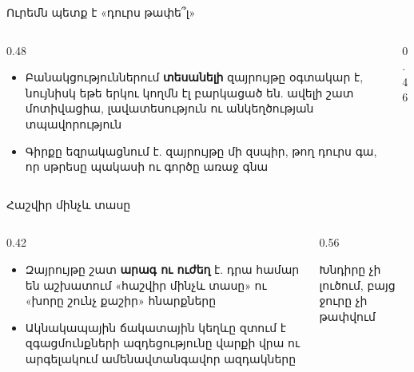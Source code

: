 \begin{frame}{Ուրեմն պետք է «դուրս թափե՞լ»}
  \begin{columns}[T]
    \begin{column}{0.48\textwidth}
      \begin{itemize}
        \item Բանակցություններում \textbf{տեսանելի} զայրույթը օգտակար է, նույնիսկ եթե երկու կողմն էլ բարկացած են. ավելի շատ մոտիվացիա, լավատեսություն ու անկեղծության տպավորություն
        \item<2-> Գիրքը եզրակացնում է. զայրույթը մի զսպիր, թող դուրս գա, որ սթրեսը պակասի ու գործը առաջ գնա
      \end{itemize}
    \end{column}
    \begin{column}{0.46\textwidth}
    \end{column}
  \end{columns}
\end{frame}

\begin{frame}{Հաշվիր մինչև տասը}
  \begin{columns}[c]
    \begin{column}{0.42\textwidth}
      \begin{itemize}
        \item Զայրույթը շատ \textbf{արագ ու ուժեղ} է. դրա համար են աշխատում «հաշվիր մինչև տասը» ու «խորը շունչ քաշիր» հնարքները
        \item<2-> Ակնակապային ճակատային կեղևը զտում է զգացմունքների ազդեցությունը վարքի վրա ու արգելակում ամենավտանգավոր ազդակները
      \end{itemize}
    \end{column}
    \begin{column}{0.56\textwidth}
      \centering
      \par\smallskip
      {\small Խնդիրը չի լուծում, բայց ջուրը չի թափվում}
    \end{column}
  \end{columns}
\end{frame}

